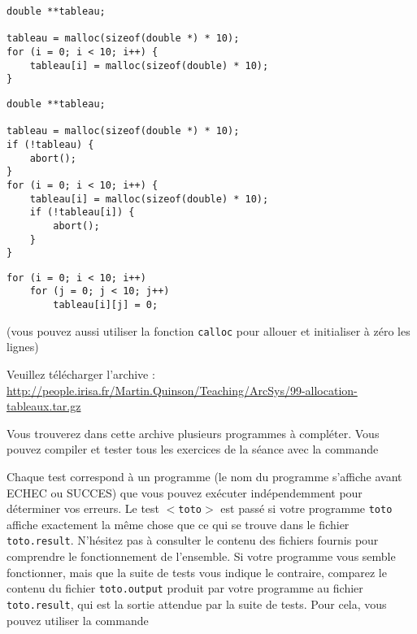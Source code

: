 \documentclass[10pt]{article}\usepackage[enonce]{exemptty}
\begin{document}
\begin{Verbatim}[label=Exemple: allocation d'un tableau de 10*10 doubles (sans aucune vérification)]
double **tableau;

tableau = malloc(sizeof(double *) * 10);
for (i = 0; i < 10; i++) {
    tableau[i] = malloc(sizeof(double) * 10);
}
\end{Verbatim}

\noindent\begin{minipage}{.64\linewidth}
\begin{Verbatim}[label=Idem avec gestion des erreurs]
double **tableau;

tableau = malloc(sizeof(double *) * 10);
if (!tableau) {
    abort();
}
for (i = 0; i < 10; i++) {
    tableau[i] = malloc(sizeof(double) * 10);
    if (!tableau[i]) {
        abort();
    }
}
\end{Verbatim}
\end{minipage}
\hfill
\begin{minipage}{.35\linewidth}
\begin{Verbatim}[label=Initialisation des éléments,numbers=right]    
for (i = 0; i < 10; i++)
    for (j = 0; j < 10; j++)
        tableau[i][j] = 0;
\end{Verbatim}

(vous pouvez aussi utiliser la fonction \verb~calloc~ pour allouer et initialiser à zéro les lignes)
\end{minipage}

\medskip

Veuillez télécharger l'archive :\\
\url{http://people.irisa.fr/Martin.Quinson/Teaching/ArcSys/99-allocation-tableaux.tar.gz}

Vous trouverez dans cette archive plusieurs programmes à compléter. Vous pouvez
compiler et tester tous les exercices de la séance avec la commande 

Chaque test correspond à un programme (le nom du programme s'affiche avant
ECHEC ou SUCCES) que vous pouvez exécuter indépendemment pour déterminer vos
erreurs. Le test \texttt{$<$toto$>$} est passé si votre programme \texttt{toto}
affiche exactement la même chose que ce qui se trouve dans le fichier
\texttt{toto.result}. N'hésitez pas à consulter le contenu des fichiers fournis
pour comprendre le fonctionnement de l'ensemble. Si votre programme vous semble
fonctionner, mais que la suite de tests vous indique le contraire, comparez le
contenu du fichier \texttt{toto.output} produit par votre programme au fichier
\texttt{toto.result}, qui est la sortie attendue par la suite de tests. Pour
cela, vous pouvez utiliser la commande
\end{document}
